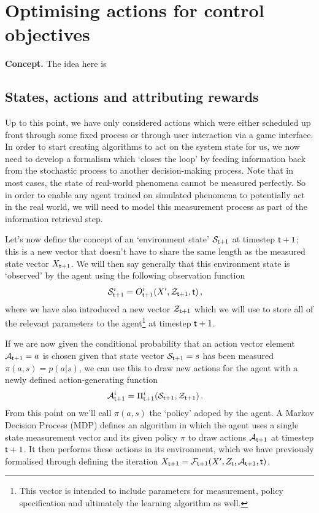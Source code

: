\chapter{\sffamily Optimising actions for control objectives}

{\bfseries\sffamily Concept.} The idea here is 

\section{\sffamily States, actions and attributing rewards}

Up to this point, we have only considered actions which were either scheduled up front through some fixed process or through user interaction via a game interface. In order to start creating algorithms to act on the system state for us, we now need to develop a formalism which `closes the loop' by feeding information back from the stochastic process to another decision-making process. Note that in most cases, the state of real-world phenomena cannot be measured perfectly. So in order to enable any agent trained on simulated phenomena to potentially act in the real world, we will need to model this measurement process as part of the information retrieval step.

Let's now define the concept of an `environment state' ${\cal S}_{{\sf t}+1}$ at timestep ${\sf t}+1$; this is a new vector that doesn't have to share the same length as the measured state vector $X_{{\sf t}+1}$. We will then say generally that this environment state is `observed' by the agent using the following observation function
\begin{align}
{\cal S}_{{\sf t}+1}^i &= O_{{\sf t}+1}^i(X',{\cal Z}_{{\sf t}+1},{\sf t}) \label{eq:generalised-state-measurement} \,,
\end{align}
where we have also introduced a new vector ${\cal Z}_{{\sf t}+1}$ which we will use to store all of the relevant parameters to the agent\footnote{This vector is intended to include parameters for measurement, policy specification and ultimately the learning algorithm as well.} at timestep ${\sf t}+1$.

If we are now given the conditional probability that an action vector element ${\cal A}_{{\sf t}+1}=a$ is chosen given that state vector ${\cal S}_{{\sf t}+1}=s$ has been measured $\pi (a,s) = p(a\vert s)$, we can use this to draw new actions for the agent with a newly defined action-generating function
\begin{align}
{\cal A}_{{\sf t}+1}^i &= \Pi_{{\sf t}+1}^i({\cal S}_{{\sf t}+1}, {\cal Z}_{{\sf t}+1}) \label{eq:action-generating-function} \,.
\end{align}
From this point on we'll call $\pi (a,s)$ the `policy' adoped by the agent. A Markov Decision Process (MDP) defines an algorithm in which the agent uses a single state measurement vector and its given policy $\pi$ to draw actions ${\cal A}_{{\sf t}+1}$ at timestep ${{\sf t}+1}$. It then performs these actions in its environment, which we have previously formalised through defining the iteration $X_{{\sf t}+1} = {\cal F}_{{\sf t}+1}(X',Z_{\sf t},{\cal A}_{{\sf t}+1},{\sf t})$. 

